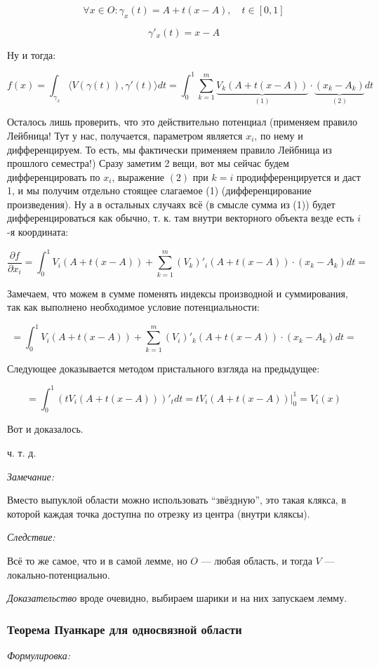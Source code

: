 \documentclass{article}
\def\sk#1#2{\langle #1, #2 \rangle}
\begin{document}
\[\forall x \in O : \gamma_x(t) = A + t(x - A), \quad t \in [0, 1]\]

\[\gamma'_x(t) = x - A\]

Ну и тогда:

\[f(x) = \int_{\gamma_x} \sk{V(\gamma(t))}{\gamma'(t)}dt = \int_0^1 \sum_{k = 1}^m \underbrace{V_k(A + t(x - A))}_{(1)}\cdot\underbrace{(x_k - A_k)}_{(2)} dt\]

Осталось лишь проверить, что это действительно потенциал (применяем правило Лейбница! Тут у нас, получается, параметром является $x_i$, по нему и дифференцируем. То есть, мы фактически применяем правило Лейбница из прошлого семестра!) Сразу заметим 2 вещи, вот мы сейчас будем дифференцировать по $x_i$, выражение $(2)$ при $k = i$ продифференцируется и даст 1, и мы получим отдельно стоящее слагаемое (1) (дифференцирование произведения). Ну а в остальных случаях всё (в смысле сумма из (1)) будет дифференцироваться как обычно, т. к. там внутри векторного объекта везде есть $i$-я координата:

\[\frac{\partial f}{\partial x_i} = \int_0^1 V_i(A + t(x - A)) + \sum_{k = 1}^m (V_k)'_i(A + t(x - A)) \cdot (x_k - A_k )dt = \]

Замечаем, что можем в сумме поменять индексы производной и суммирования, так как выполнено необходимое условие потенциальности:

\[ = \int_0^1 V_i(A + t(x - A)) + \sum_{k = 1}^m (V_i)'_k(A + t(x - A)) \cdot (x_k - A_k )dt =\]

Следующее доказывается методом пристального взгляда на предыдущее:

\[ = \int_0^1 \left(tV_i(A + t(x - A))\right)'_t dt = tV_i(A + t(x - A))|_0^1 = V_i(x)\]

Вот и доказалось.

ч. т. д. 

\textit{Замечание:}

Вместо выпуклой области можно использовать ``звёздную'', это такая клякса, в которой каждая точка доступна по отрезку из центра (внутри кляксы).

\textit{Следствие:}

Всё то же самое, что и в самой лемме, но $O$ --- любая область, и тогда $V$ --- локально-потенциально.

\textit{Доказательство} вроде очевидно, выбираем шарики и на них запускаем лемму.


\subsubsection{Теорема Пуанкаре для односвязной области}
\textit{Формулировка:}
\end{document}
